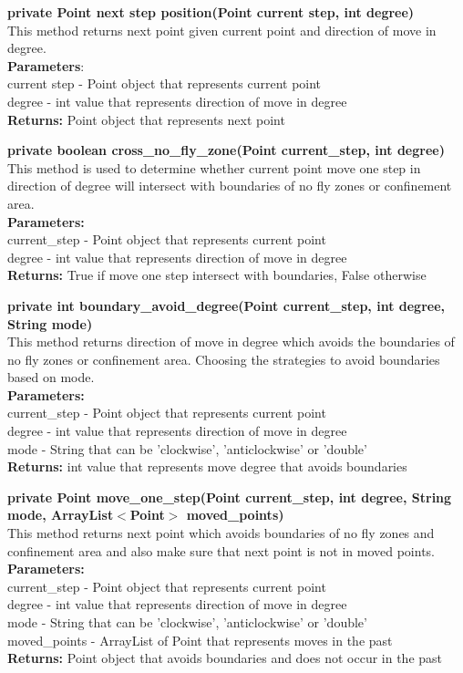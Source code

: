 \documentclass[12pt]{article}
\begin{document}
\textbf{private Point next step position(Point current step, int degree)}\\
This method returns next point given current point and direction of move in degree.\\
\textbf{Parameters}:\\
current step - Point object that represents current point\\
degree - int value that represents direction of move in degree\\
\textbf{Returns:} Point object that represents next point

\textbf{private boolean cross\_no\_fly\_zone(Point current\_step, int degree)}\\
This method is used to determine whether current point move one step in direction of degree will intersect with boundaries of no fly zones or confinement area.\\
\textbf{Parameters:} \\
current\_step - Point object that represents current point\\
degree - int value that represents direction of move in degree\\
\textbf{Returns:} True if move one step intersect with boundaries, False otherwise

\textbf{private int boundary\_avoid\_degree(Point current\_step, int degree, String mode)}\\
This method returns direction of move in degree which avoids the boundaries of no fly zones or confinement area. Choosing the strategies to avoid boundaries based on mode.\\
\textbf{Parameters:} \\
current\_step - Point object that represents current point\\
degree - int value that represents direction of move in degree\\
mode - String that can be 'clockwise', 'anticlockwise' or 'double'\\
\textbf{Returns:} int value that represents move degree that avoids boundaries

\textbf{private Point move\_one\_step(Point current\_step, int degree, String mode, ArrayList$<$Point$>$ moved\_points)}\\
This method returns next point which avoids boundaries of no fly zones and confinement area and also make sure that next point is not in moved points.\\
\textbf{Parameters:} \\
current\_step - Point object that represents current point\\
degree - int value that represents direction of move in degree\\
mode - String that can be 'clockwise', 'anticlockwise' or 'double'\\
moved\_points - ArrayList of Point that represents moves in the past\\
\textbf{Returns:} Point object that avoids boundaries and does not occur in the past
\end{document}
